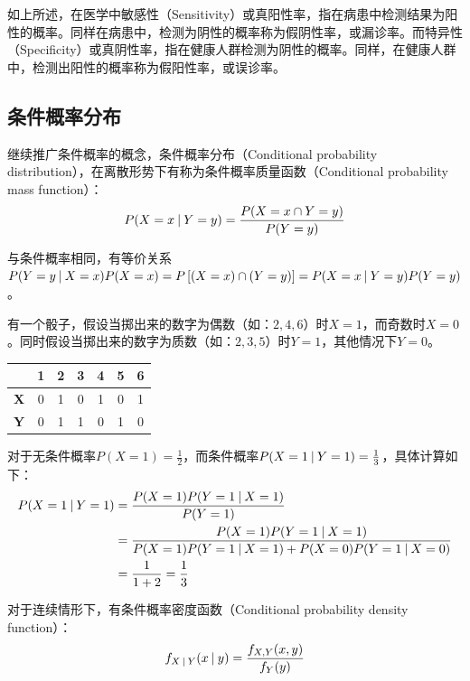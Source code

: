 \documentclass[11pt]{article}
\begin{document}
\begin{example}
\begin{remark}
        如上所述，在医学中敏感性（Sensitivity）或真阳性率，指在病患中检测结果为阳性的概率。同样在病患中，检测为阴性的概率称为假阴性率，或漏诊率。而特异性（Specificity）或真阴性率，指在健康人群检测为阴性的概率。同样，在健康人群中，检测出阳性的概率称为假阳性率，或误诊率。
    \end{remark}
\end{example}

\subsection{条件概率分布}

继续推广条件概率的概念，条件概率分布（Conditional probability distribution），在离散形势下有称为条件概率质量函数（Conditional probability mass function）：
\begin{equation*}
    P(X=x\:\vert\: Y=y) = \frac{P(X=x\cap Y=y)}{P(Y=y)}
\end{equation*}

与条件概率相同，有等价关系$P(Y=y\:\vert\: X=x)P(X=x) = P\left[(X=x)\cap (Y=y)\right] = P(X=x\:\vert\: Y=y)P(Y=y)$。

\begin{example}
    有一个骰子，假设当掷出来的数字为偶数（如：$2,4,6$）时$X=1$，而奇数时$X=0$。同时假设当掷出来的数字为质数（如：$2,3,5$）时$Y=1$，其他情况下$Y=0$。
    \begin{table}[ht!]
    \centering
    \begin{tabular}{@{}ccccccc@{}}
    \toprule
    & \textbf{1} & \textbf{2} & \textbf{3} & \textbf{4} & \textbf{5} & \textbf{6} \\ \midrule
    \textbf{X} & 0 & 1 & 0 & 1 & 0 & 1 \\
    \textbf{Y} & 0 & 1 & 1 & 0 & 1 & 0 \\ \bottomrule
    \end{tabular}
    \end{table}
    
    对于无条件概率$P(X=1) = \frac{1}{2}$，而条件概率$P(X=1\:\vert\: Y=1) = \frac{1}{3}$，具体计算如下：
    \begin{align*}
        P(X=1\:\vert\: Y=1) &= \frac{P(X=1)P(Y=1\:\vert\: X=1)}{P(Y=1)} \\
        &= \frac{P(X=1)P(Y=1\:\vert\: X=1)}{P(X=1)P(Y=1\:\vert\: X=1) + P(X=0)P(Y=1\:\vert\: X=0)} \\
        &= \frac{1}{1+2} = \frac{1}{3}
    \end{align*}
\end{example}

对于连续情形下，有条件概率密度函数（Conditional probability density function）：
\begin{equation*}
    f_{X\:\vert\: Y}(x\:\vert\: y) = \frac{f_{X,Y}(x,y)}{f_Y(y)}
\end{equation*}
\end{document}
